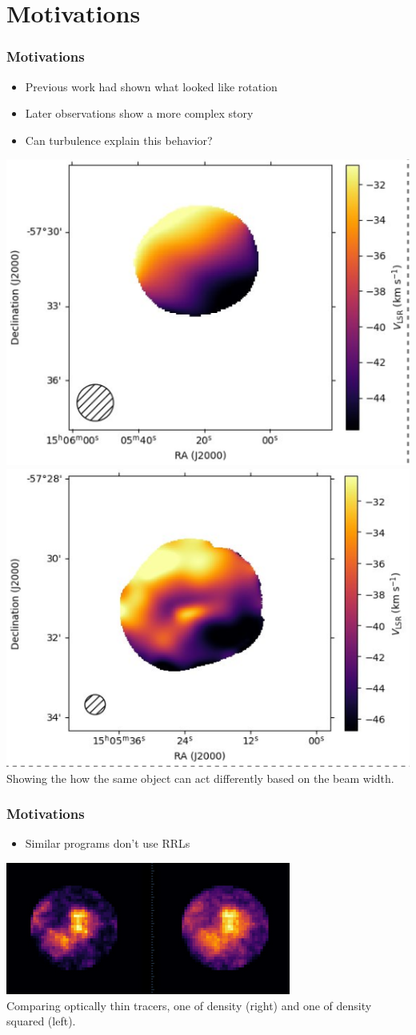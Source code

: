 \documentclass[aspectratio=169,compress]{beamer}
\newcommand\teeny{\fontsize{3pt}{3.6pt}\selectfont}
\begin{document}
\section{Motivations}
\begin{frame}
  \frametitle{Motivations}
  \begin{itemize}
    \item Previous work had shown what looked like rotation
    \item Later observations show a more complex story
    \item Can turbulence explain this behavior?
  \end{itemize}
  \centering
  \vspace{3mm}
  \includegraphics[width=0.3\linewidth]{figures/bigrealVLSR.png}
  \includegraphics[width=0.3\linewidth]{figures/smallrealVLSR.png}
  {\teeny\\ Showing the how the same object can act differently based on the beam width.}

\end{frame}

\begin{frame}
  \frametitle{Motivations}
  \begin{itemize}
    \item Similar programs don't use RRLs
  \end{itemize}
  \centering
  \vspace{3mm}
  \includegraphics[width=0.5\linewidth]{figures/density_sq.png}
  {\teeny\\ Comparing optically thin tracers, one of density (right) and one of density squared (left).}
\end{frame}
\end{document}
